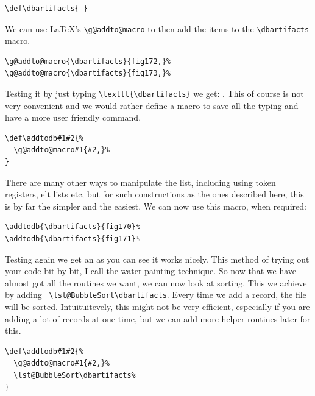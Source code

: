 \begin{verbatim}
\def\dbartifacts{ }
\end{verbatim}
\let\dbartifacts\empty

We can use \LaTeX's \verb+\g@addto@macro+ to then add the items to the \verb+\dbartifacts+ macro.
\begin{verbatim}
\g@addto@macro{\dbartifacts}{fig172,}%
\g@addto@macro{\dbartifacts}{fig173,}%
\end{verbatim}

\g@addto@macro{\dbartifacts}{fig172,}%
\g@addto@macro{\dbartifacts}{fig173,}%


Testing it by just typing \verb+\texttt{\dbartifacts}+ we get: \texttt{\dbartifacts}. This of course is not very convenient and we would rather define a macro to save all the typing and have a more user friendly command.

\begin{verbatim}
\def\addtodb#1#2{%
  \g@addto@macro#1{#2,}%
}
\end{verbatim}
\def\addtodb#1#2{%
  \g@addto@macro#1{#2,}%
  \lst@BubbleSort\dbartifacts%
}

\clearpage

There are many other ways to manipulate the list, including using token registers, elt lists etc, but for such constructions as the ones described here, this is by far the simpler and the easiest.
We can now use this macro, when required:

\begin{verbatim}
\addtodb{\dbartifacts}{fig170}%
\addtodb{\dbartifacts}{fig171}%
\end{verbatim}

Testing again we get \texttt{\dbartifacts} an as you can see it works nicely. This method of trying out your code bit by bit, I call the water painting technique. So now that we have almost got all the routines we want, we can now look at sorting. This we achieve by adding \verb+ \lst@BubbleSort\dbartifacts+. Every time we add a record, the file will be sorted. Intuituitevely, this might not  be very efficient, especially if you are adding a lot of records at one time, but we can add more helper routines later for this.

\begin{verbatim}
\def\addtodb#1#2{%
  \g@addto@macro#1{#2,}%
  \lst@BubbleSort\dbartifacts%
}
\end{verbatim}

